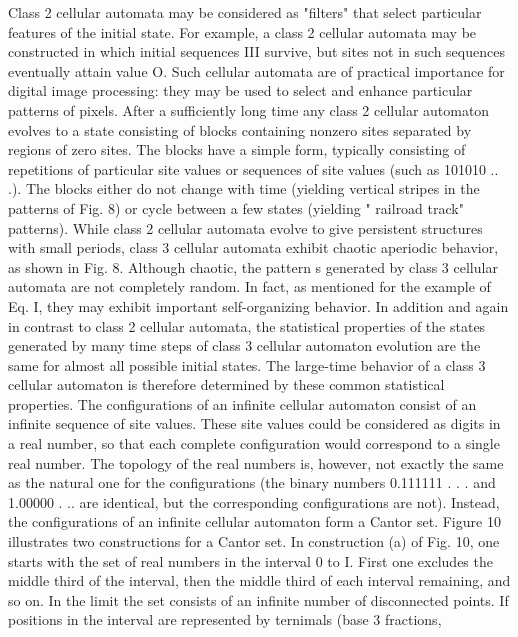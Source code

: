 Class 2 cellular automata may be considered as "filters" that select particular
features of the initial state. 
For example, a class 2 cellular automata may be 
constructed in which initial sequences III survive, 
but sites not in such sequences eventually attain value O. 
Such cellular automata are of practical importance 
for digital image processing:
they may be used to select and enhance
particular patterns of pixels. 
After a sufficiently long time any class 2 cellular 
automaton evolves to a state consisting of blocks
containing nonzero sites separated by regions of zero sites. 
The blocks have a simple form, typically consisting 
of repetitions of particular site values or sequences of site
values (such as 101010 .. .). 
The blocks either do not change with time 
(yielding vertical stripes in the patterns of Fig. 8) 
or cycle between a few states 
(yielding " railroad track" patterns).
While class 2 cellular automata evolve to
give persistent structures with small periods,
class 3 cellular automata exhibit chaotic
aperiodic behavior, as shown in Fig. 8.
Although chaotic, the pattern s generated by
class 3 cellular automata are not completely random. 
In fact, as mentioned for the example of Eq. I, 
they may exhibit important self-organizing behavior. 
In addition and again in contrast to class 2 cellular automata, 
the statistical properties of the states generated
by many time steps of class 3 cellular
automaton evolution are the same for almost
all possible initial states.
The large-time behavior of a class 3 cellular automaton is
therefore determined by these common statistical properties.
The configurations of an infinite cellular
automaton consist of an infinite sequence of
site values. 
These site values could be considered as digits in a real number, 
so that each complete configuration would correspond to a single real number. 
The topology of the real numbers is, however, not
exactly the same as the natural one for the configurations 
(the binary numbers 0.111111 . . . and 1.00000 . .. are identical,
but the corresponding configurations are not). 
Instead, the configurations of an infinite
cellular automaton form a Cantor set. 
Figure 10 illustrates two constructions for a Cantor set.
In construction (a) of Fig. 10, one starts with 
the set of real numbers in the interval 0 to I. 
First one excludes the middle third of the interval, 
then the middle third of each interval remaining, and so on. 
In the limit the set consists of an infinite number of disconnected points. 
If positions in the interval are
represented by ternimals (base 3 fractions,
